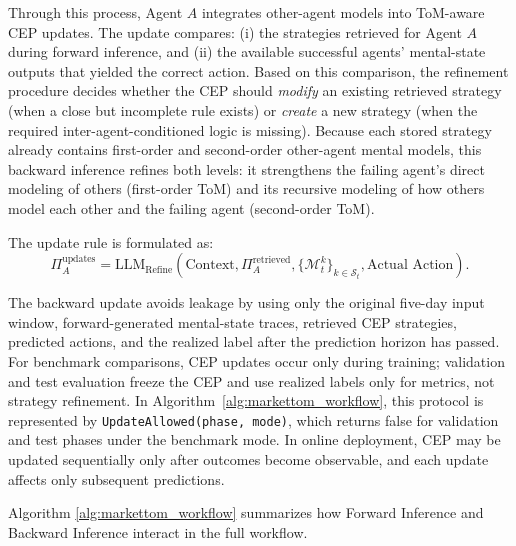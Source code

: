 \documentclass[a4paper,fleqn,doubleblind]{cas-sc}
\newcommand{\revise}[1]{{\color{blue}#1}}
\begin{document}
Through this process, Agent $A$ integrates other-agent models into ToM-aware CEP updates. The update compares: (i) the strategies retrieved for Agent $A$ during forward inference, and (ii) the available successful agents' mental-state outputs that yielded the correct action. Based on this comparison, the refinement procedure decides whether the CEP should \emph{modify} an existing retrieved strategy (when a close but incomplete rule exists) or \emph{create} a new strategy (when the required inter-agent-conditioned logic is missing). Because each stored strategy already contains first-order and second-order other-agent mental models, this backward inference refines both levels: it strengthens the failing agent's direct modeling of others (first-order ToM) and its recursive modeling of how others model each other and the failing agent (second-order ToM).

The update rule is formulated as:
\begin{equation}
\Pi_{A}^{\text{updates}} = \text{LLM}_{\text{Refine}}(\text{Context}, \Pi_{A}^{\text{retrieved}}, \{\mathcal{M}_t^{k}\}_{k \in \mathcal{S}_t}, \text{Actual Action}).
\label{eq:strategy_update}
\end{equation}

\revise{The backward update avoids leakage by using only the original five-day input window, forward-generated mental-state traces, retrieved CEP strategies, predicted actions, and the realized label after the prediction horizon has passed. For benchmark comparisons, CEP updates occur only during training; validation and test evaluation freeze the CEP and use realized labels only for metrics, not strategy refinement. In Algorithm~\ref{alg:markettom_workflow}, this protocol is represented by \texttt{UpdateAllowed(phase, mode)}, which returns false for validation and test phases under the benchmark mode. In online deployment, CEP may be updated sequentially only after outcomes become observable, and each update affects only subsequent predictions.}

Algorithm \ref{alg:markettom_workflow} summarizes how Forward Inference and Backward Inference interact in the full workflow.
\end{document}
